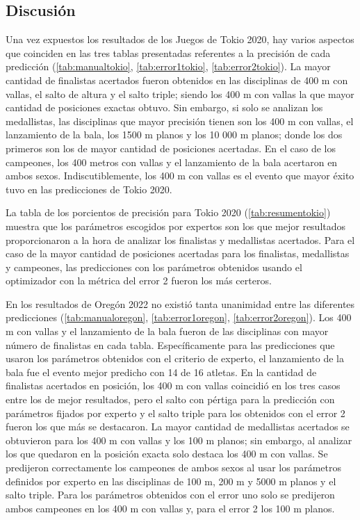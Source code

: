 \subsection{Discusión}

Una vez expuestos los resultados de los Juegos de Tokio 2020, hay varios aspectos que coinciden en las tres tablas presentadas referentes a la precisión de cada predicción (\ref{tab:manualtokio}, \ref{tab:error1tokio}, \ref{tab:error2tokio}). La mayor cantidad de finalistas acertados fueron obtenidos en las disciplinas de 400 m con vallas, el salto de altura y el salto triple; siendo los 400 m con vallas la que mayor cantidad de posiciones exactas obtuvo. Sin embargo, si solo se analizan los medallistas, las disciplinas que mayor precisión tienen son los 400 m con vallas, el lanzamiento de la bala, los 1500 m planos y los 10 000 m planos; donde los dos primeros son los de mayor cantidad de posiciones acertadas. En el caso de los campeones, los 400 metros con vallas y el lanzamiento de la bala acertaron en ambos sexos. Indiscutiblemente, los 400 m con vallas es el evento que mayor éxito tuvo en las predicciones de Tokio 2020.

La tabla de los porcientos de precisión para Tokio 2020 (\ref{tab:resumentokio}) muestra que los parámetros escogidos por expertos son los que mejor resultados proporcionaron a la hora de analizar los finalistas y medallistas acertados. Para el caso de la mayor cantidad de posiciones acertadas para los finalistas, medallistas y campeones, las predicciones con los parámetros obtenidos usando el optimizador con la métrica del error 2 fueron los más certeros.

En los resultados de Oregón 2022 no existió tanta unanimidad entre las diferentes predicciones (\ref{tab:manualoregon}, \ref{tab:error1oregon}, \ref{tab:error2oregon}). Los 400 m con vallas y el lanzamiento de la bala fueron de las disciplinas con mayor número de finalistas en cada tabla. Específicamente para las predicciones que usaron los parámetros obtenidos con el criterio de experto, el lanzamiento de la bala fue el evento mejor predicho con 14 de 16 atletas. En la cantidad de finalistas acertados en posición, los 400 m con vallas coincidió en los tres casos entre los de mejor resultados, pero el salto con pértiga para la predicción con parámetros fijados por experto y el salto triple para los obtenidos con el error 2 fueron los que más se destacaron. La mayor cantidad de medallistas acertados se obtuvieron para los 400 m con vallas y los 100 m planos; sin embargo, al analizar los que quedaron en la posición exacta solo destaca los 400 m con vallas. Se predijeron correctamente los campeones de ambos sexos al usar los parámetros definidos por experto en las disciplinas de 100 m, 200 m y 5000 m planos y el salto triple. Para los parámetros obtenidos con el error uno solo se predijeron ambos campeones en los 400 m con vallas y, para el error 2 los 100 m planos.

